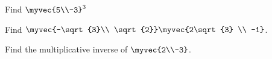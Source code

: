 \item Find $\myvec{5\\-3}^3$
\\
\solution 

\item Find $\myvec{-\sqrt{3}\\ \sqrt{2}} \myvec{2\sqrt{3} \\ -1}$.
\\
\solution 
\item Find the multiplicative inverse of $\myvec{2\\-3}$.
\\
\solution


